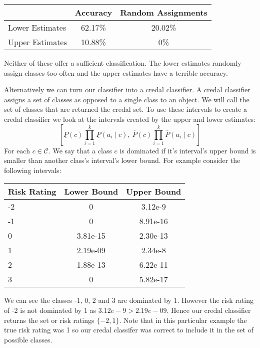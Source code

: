 \begin{center}
	\begin{tabular}{l|c c}
	                & Accuracy & Random Assignments \\
	\hline
	Lower Estimates & 62.17\%  & 20.02\%            \\
	Upper Estimates & 10.88\%  & 0\%                \\
	\end{tabular}
\end{center}

Neither of these offer a sufficient classification.
The lower estimates randomly assign classes too often and the upper estimates have a terrible accuracy.

Alternatively we can turn our classifier into a credal classifier.
A credal classifier assigns a set of classes as opposed to a single class to an object.
We will call the set of classes that are returned the credal set.
To use these intervals to create a credal classifier we look at the intervals created by the upper and lower estimates:
\begin{equation}
	\left[ \underline{P}(c)\prod_{i=1}^k \underline{P}(a_i \mid c), \ \overline{P}(c)\prod_{i=1}^k \overline{P}(a_i \mid c) \right]
\end{equation}
For each $c \in \mathcal{C}$.
We say that a class $c$ is dominated if it's interval's upper bound is smaller than another class's interval's lower bound.
For example consider the following intervals:

\begin{center}
	\begin{tabular}{l|c c}
	Risk Rating & Lower Bound & Upper Bound \\
	\hline
	-2          & 0           & 3.12e-9        \\
	-1          & 0           & 8.91e-16       \\
	0           & 3.81e-15    & 2.30e-13       \\
	1           & 2.19e-09    & 2.34e-8        \\
	2           & 1.88e-13    & 6.22e-11       \\
	3           & 0           & 5.82e-17       \\
	\end{tabular}
\end{center}
We can see the classes -1, 0, 2 and 3 are dominated by 1.
However the risk rating of -2 is not dominated by 1 as $3.12e-9 > 2.19e-09$.
Hence our credal classifier returns the set or risk ratings $\{-2, 1\}$.
Note that in this particular example the true risk rating was 1 so our credal classifer was correct to include it in the set of possible classes.

